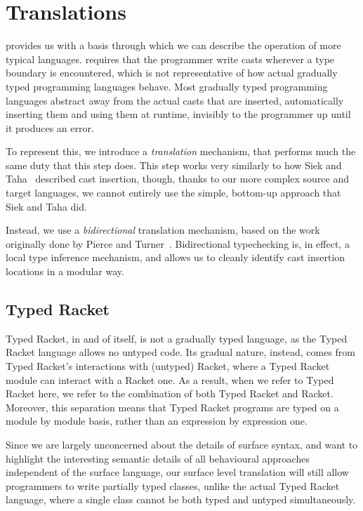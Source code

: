 \documentclass[a4paper,USenglish]{tex/lipics-v2016}
\begin{document}
\section{Translations}

\kafka provides us with a basis through which we can describe the operation
of more typical languages. \kafka requires that the programmer write casts
wherever a type boundary is encountered, which is not representative of how
actual gradually typed programming languages behave. Most gradually typed
programming languages abstract away from the actual casts that are inserted,
automatically inserting them and using them at runtime, invisibly to the
programmer up until it produces an error.

To represent this, we introduce a \emph{translation} mechanism, that performs much the same duty that this step does. This step works very similarly to how Siek and Taha~\cite{SiekTaha06} described cast insertion, though, thanks to our more complex source and target languages, we cannot entirely use the simple, bottom-up approach that Siek and Taha did.

Instead, we use a \emph{bidirectional} translation mechanism, based on the work originally done by Pierce and Turner~\cite{lti-pierce}. Bidirectional typechecking is, in effect, a local type inference mechanism, and allows us to cleanly identify cast insertion locations in a modular way.


\subsection{Typed Racket}

Typed Racket, in and of itself, is not a gradually typed language, as the Typed Racket language allows no untyped code. Its gradual nature, instead, comes from Typed Racket's interactions with (untyped) Racket, where a Typed Racket module can interact with a Racket one. As a result, when we refer to Typed Racket here, we refer to the combination of both Typed Racket and Racket. Moreover, this separation means that Typed Racket programs are typed on a module by module basis, rather than an expression by expression one.

Since we are largely unconcerned about the details of surface syntax, and want to highlight the interesting semantic details of all behavioural approaches independent of the surface language, our surface level translation will still allow programmers to write partially typed classes, unlike the actual Typed Racket language, where a single class cannot be both typed and untyped simultaneously.
\end{document}
